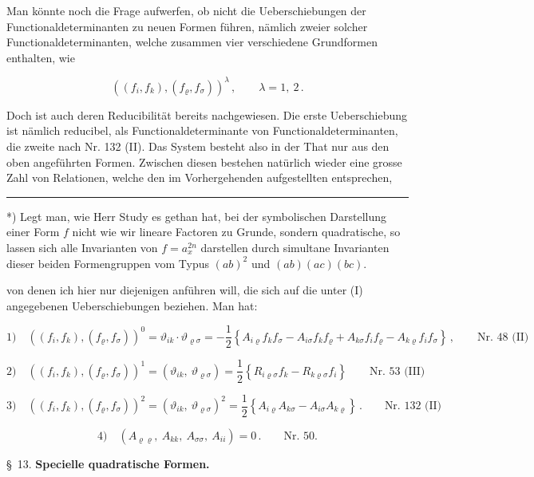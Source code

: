 Man k\"onnte noch die Frage aufwerfen, ob nicht die Ueberschiebungen der Functionaldeterminanten zu neuen Formen f\"uhren, n\"amlich zweier solcher Functionaldeterminanten, welche zusammen vier verschiedene Grundformen enthalten, wie

\[
((f_i, f_k), (f_\varrho, f_\sigma))^\lambda\,, \qquad \lambda = 1,\ 2\,. \tag{I}
\]

Doch ist auch deren Reducibilit\"at bereits nachgewiesen. Die erste Ueberschiebung ist n\"amlich reducibel, als Functionaldeterminante von Functionaldeterminanten, die zweite nach Nr. 132 (II). Das System besteht also in der That nur aus den oben angef\"uhrten Formen. Zwischen diesen bestehen nat\"urlich wieder eine grosse Zahl von Relationen, welche den im Vorhergehenden aufgestellten entsprechen,

\noindent\rule{4cm}{0.4pt}

*) Legt man, wie Herr Study es gethan hat, bei der symbolischen Darstellung einer Form $f$ nicht wie wir lineare Factoren zu Grunde, sondern quadratische, so lassen sich alle Invarianten von $f = a_x^{2n}$ darstellen durch simultane Invarianten dieser beiden Formengruppen vom Typus $(ab)^2$ und $(ab)(ac)(bc)$.



von denen ich hier nur diejenigen anf\"uhren will, die sich auf die unter (I) angegebenen Ueberschiebungen beziehen. Man hat:

\[
1)\quad ((f_i, f_k), (f_\varrho, f_\sigma))^0 = \vartheta_{ik}\cdot\vartheta_{\varrho\sigma}
= -\frac{1}{2}\left\{ A_{i\varrho} f_k f_\sigma - A_{i\sigma} f_k f_\varrho + A_{k\sigma} f_i f_\varrho - A_{k\varrho} f_i f_\sigma \right\}\,, \qquad \text{Nr. 48 (II)}
\]

\[
2)\quad ((f_i, f_k), (f_\varrho, f_\sigma))^1 = (\vartheta_{ik},\ \vartheta_{\varrho\sigma})
= \frac{1}{2}\left\{ R_{i\varrho\sigma} f_k - R_{k\varrho\sigma} f_i \right\} \qquad \text{Nr. 53 (III)}
\]

\[
3)\quad ((f_i, f_k), (f_\varrho, f_\sigma))^2 = (\vartheta_{ik},\ \vartheta_{\varrho\sigma})^2
= \frac{1}{2}\left\{ A_{i\varrho} A_{k\sigma} - A_{i\sigma} A_{k\varrho} \right\}\,. \qquad \text{Nr. 132 (II)}
\]

\[
4)\quad (A_{\varrho\varrho},\ A_{kk},\ A_{\sigma\sigma},\ A_{ii}) = 0\,. \qquad \text{Nr. 50.}
\]

\begin{center}
\S\ 13. \textbf{Specielle quadratische Formen.}
\end{center}

